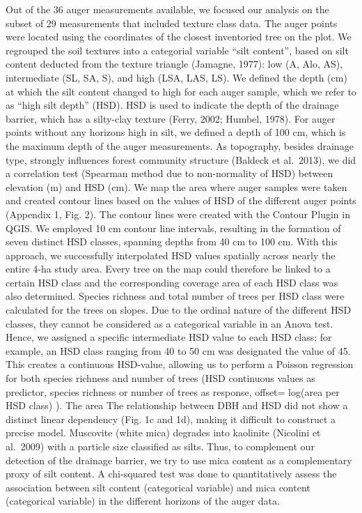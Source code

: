 \documentclass[fleqn,12pt]{latex/stylish_article} %
\begin{document}
Out of the 36 auger measurements available, we focused our analysis on the subset of 29 measurements that included texture class data. The auger points were located using the coordinates of the closest inventoried tree on the plot. We regrouped the soil textures into a categorial variable \enquote{silt content}, based on silt content deducted from the texture triangle (Jamagne, 1977): low (A, Alo, AS), intermediate (SL, SA, S), and high (LSA, LAS, LS). We defined the depth (cm) at which the silt content changed to high for each auger sample, which we refer to as \enquote{high silt depth} (HSD). HSD is used to indicate the depth of the drainage barrier, which has a silty-clay texture (Ferry, 2002; Humbel, 1978). For auger points without any horizons high in silt, we defined a depth of 100 cm, which is the maximum depth of the auger measurements. As topography, besides drainage type, strongly influences forest community structure (Baldeck et al.~2013), we did a correlation test (Spearman method due to non-normality of HSD) between elevation (m) and HSD (cm).
We map the area where auger samples were taken and created contour lines based on the values of HSD of the different auger points (Appendix 1, Fig. 2). The contour lines were created with the Contour Plugin in QGIS. We employed 10 cm contour line intervals, resulting in the formation of seven distinct HSD classes, spanning depths from 40 cm to 100 cm. With this approach, we successfully interpolated HSD values spatially across nearly the entire 4-ha study area. Every tree on the map could therefore be linked to a certain HSD class and the corresponding coverage area of each HSD class was also determined.
Species richness and total number of trees per HSD class were calculated for the trees on slopes. Due to the ordinal nature of the different HSD classes, they cannot be considered as a categorical variable in an Anova test. Hence, we assigned a specific intermediate HSD value to each HSD class; for example, an HSD class ranging from 40 to 50 cm was designated the value of 45. This creates a continuous HSD-value, allowing us to perform a Poisson regression for both species richness and number of trees (HSD continuous values as predictor, species richness or number of trees as response, offset= log(area per HSD class) ). The area The relationship between DBH and HSD did not show a distinct linear dependency (Fig. 1c and 1d), making it difficult to construct a precise model.
Muscovite (white mica) degrades into kaolinite (Nicolini et al.~2009) with a particle size classified as silts. Thus, to complement our detection of the drainage barrier, we try to use mica content as a complementary proxy of silt content. A chi-squared test was done to quantitatively assess the association between silt content (categorical variable) and mica content (categorical variable) in the different horizons of the auger data.
\end{document}
